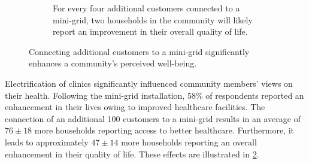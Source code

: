 \begin{figure}[t]
\begin{subfigure}[t]{0.48\textwidth}
        \caption{For every four additional customers connected to a mini-grid, two households in the community will likely report an improvement in their overall quality of life.}
        \label{fig:life_improvement}
    \end{subfigure}
    \caption{Connecting additional customers to a mini-grid significantly enhances a community's perceived well-being.}
    \label{fig:well_being}
\end{figure}

Electrification of clinics significantly influenced community members' views on their health. Following the mini-grid installation, 58\% of respondents reported an enhancement in their lives owing to improved healthcare facilities. The connection of an additional 100 customers to a mini-grid results in an average of $76\pm18$ more households reporting access to better healthcare. Furthermore, it leads to approximately $47\pm14$ more households reporting an overall enhancement in their quality of life. These effects are illustrated in \cref{fig:well_being}.

